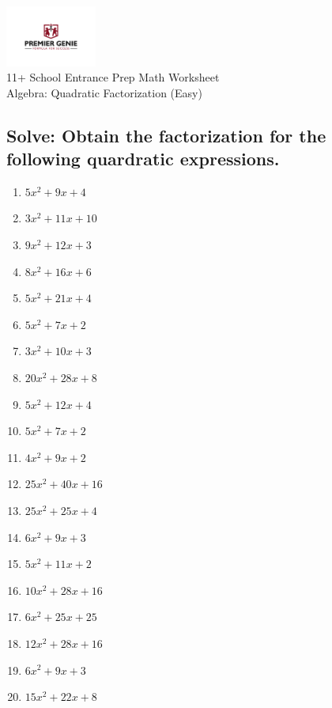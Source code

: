 \documentclass{article}
\begin{document}
\begin{center}
\includegraphics[width=3cm]{PREMGENIEJPG.jpg}\\
{\Large 11+ School Entrance Prep Math Worksheet}\\
{\Medium Algebra: Quadratic Factorization (Easy)}\\

\end{center}

\subsection*{Solve: Obtain the factorization for the following quardratic expressions.}

\begin{enumerate}
\item $\displaystyle 5 x^{2} + 9 x + 4 $ \ 
\item $\displaystyle 3 x^{2} + 11 x + 10 $ \ 
\item $\displaystyle 9 x^{2} + 12 x + 3 $ \ 
\item $\displaystyle 8 x^{2} + 16 x + 6 $ \ 
\item $\displaystyle 5 x^{2} + 21 x + 4 $ \ 
\item $\displaystyle 5 x^{2} + 7 x + 2 $ \ 
\item $\displaystyle 3 x^{2} + 10 x + 3 $ \ 
\item $\displaystyle 20 x^{2} + 28 x + 8 $ \ 
\item $\displaystyle 5 x^{2} + 12 x + 4 $ \ 
\item $\displaystyle 5 x^{2} + 7 x + 2 $ \ 
\item $\displaystyle 4 x^{2} + 9 x + 2 $ \ 
\item $\displaystyle 25 x^{2} + 40 x + 16 $ \ 
\item $\displaystyle 25 x^{2} + 25 x + 4 $ \ 
\item $\displaystyle 6 x^{2} + 9 x + 3 $ \ 
\item $\displaystyle 5 x^{2} + 11 x + 2 $ \ 
\item $\displaystyle 10 x^{2} + 28 x + 16 $ \ 
\item $\displaystyle 6 x^{2} + 25 x + 25 $ \ 
\item $\displaystyle 12 x^{2} + 28 x + 16 $ \ 
\item $\displaystyle 6 x^{2} + 9 x + 3 $ \ 
\item $\displaystyle 15 x^{2} + 22 x + 8 $ \ 


\end{enumerate}
\end{document}
